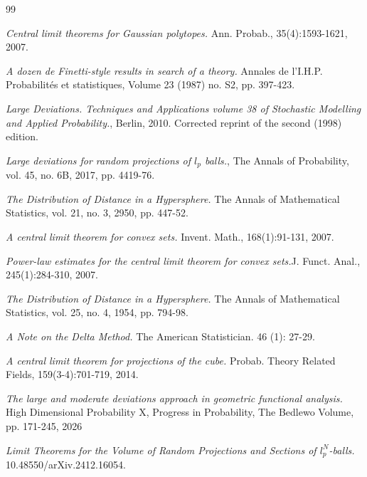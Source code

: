 \documentclass[10pt]{amsart}
\newcounter{theor}
\numberwithin{equation}{section}
\begin{document}
\begin{thebibliography}{99} %

 \textit{Central limit theorems for Gaussian polytopes.} Ann. Probab., 35(4):1593-1621, 2007.

 \textit{A dozen de Finetti-style results in search of a theory.} Annales de l'I.H.P. Probabilit\'es et statistiques, Volume 23 (1987) no. S2, pp. 397-423.

 \textit{Large Deviations. Techniques and Applications volume 38 of Stochastic Modelling and Applied Probability.}, Berlin, 2010. Corrected reprint of the second (1998) edition.

 \textit{Large deviations for random projections of $l_p$ balls.}, The Annals of Probability, vol. 45, no. 6B, 2017, pp. 4419-76.

 \textit{The Distribution of Distance in a Hypersphere.} The Annals of Mathematical Statistics, vol. 21, no. 3, 2950, pp. 447-52.

 \textit{A central limit theorem for convex sets.} Invent. Math., 168(1):91-131, 2007.

 \textit{Power-law estimates for the central limit theorem for convex sets.}J. Funct. Anal., 245(1):284-310, 2007.

 \textit{The Distribution of Distance in a Hypersphere.} The Annals of Mathematical Statistics, vol. 25, no. 4, 1954, pp. 794-98.

 \textit{A Note on the Delta Method.} The American Statistician. 46 (1): 27-29.

 \textit{A central limit theorem for projections of the cube.} Probab. Theory Related Fields, 159(3-4):701-719, 2014.

 \textit{The large and moderate deviations approach in geometric functional analysis.} High Dimensional Probability X, Progress in Probability, The Bedlewo Volume, pp. 171-245, 2026

 \textit{Limit Theorems for the Volume of Random Projections and Sections of $l_p^N$-balls.} 10.48550/arXiv.2412.16054.


\end{thebibliography}
\end{document}
